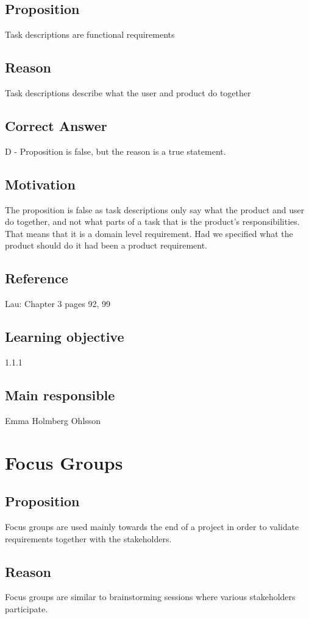 \documentclass[a4paper]{article}
\begin{document}
\subsection*{Proposition}
Task descriptions are functional requirements
\subsection*{Reason}
Task descriptions describe what the user and product do together
\subsection*{Correct Answer}
D - Proposition is false, but the reason is a true statement.
\subsection*{Motivation}
The proposition is false as task descriptions only say what the product and user do together, and not what parts of a task that is the product’s responsibilities. That means that it is a domain level requirement. Had we specified what the product should do it had been a product requirement.
\subsection*{Reference}
Lau: Chapter 3 pages 92, 99
\subsection*{Learning objective}
1.1.1
\subsection*{Main responsible}
Emma Holmberg Ohlsson


\section{Focus Groups}
\subsection*{Proposition}
Focus groups are used mainly towards the end of a project in order to validate requirements together with the stakeholders.
\subsection*{Reason}
Focus groups are similar to brainstorming sessions where various stakeholders participate.
\end{document}
